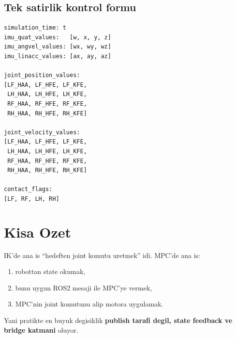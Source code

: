 \documentclass[11pt,a4paper]{article}
\begin{document}
\subsection*{Tek satirlik kontrol formu}
\begin{verbatim}
simulation_time: t
imu_quat_values:   [w, x, y, z]
imu_angvel_values: [wx, wy, wz]
imu_linacc_values: [ax, ay, az]

joint_position_values:
[LF_HAA, LF_HFE, LF_KFE,
 LH_HAA, LH_HFE, LH_KFE,
 RF_HAA, RF_HFE, RF_KFE,
 RH_HAA, RH_HFE, RH_KFE]

joint_velocity_values:
[LF_HAA, LF_HFE, LF_KFE,
 LH_HAA, LH_HFE, LH_KFE,
 RF_HAA, RF_HFE, RF_KFE,
 RH_HAA, RH_HFE, RH_KFE]

contact_flags:
[LF, RF, LH, RH]
\end{verbatim}

\section*{Kisa Ozet}
IK'de ana is ``hedeften joint komutu uretmek'' idi. MPC'de ana is:
\begin{enumerate}
  \item robottan state okumak,
  \item bunu uygun ROS2 mesaji ile MPC'ye vermek,
  \item MPC'nin joint komutunu alip motora uygulamak.
\end{enumerate}

Yani pratikte en buyuk degisiklik \textbf{publish tarafi degil, state feedback ve bridge katmani} oluyor.
\end{document}
